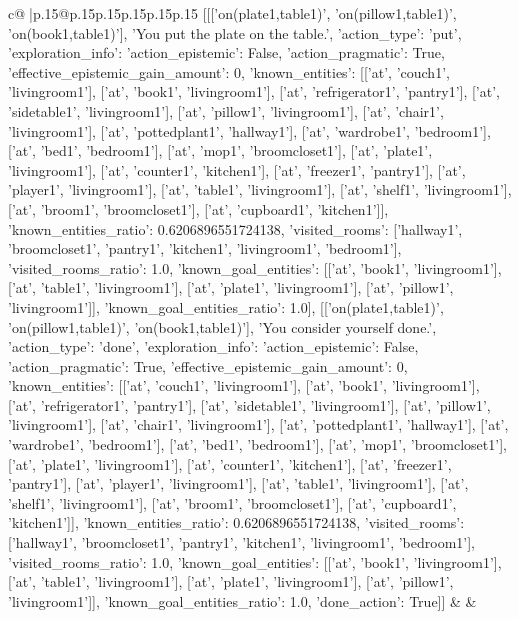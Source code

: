 \documentclass{article}
\begin{document}
{\begin{supertabular}{c@{$\;$}|p{.15\linewidth}@{}p{.15\linewidth}p{.15\linewidth}p{.15\linewidth}p{.15\linewidth}p{.15\linewidth}}
{{{	 [[['on(plate1,table1)', 'on(pillow1,table1)', 'on(book1,table1)'], 'You put the plate on the table.', {'action_type': 'put', 'exploration_info': {'action_epistemic': False, 'action_pragmatic': True, 'effective_epistemic_gain_amount': 0, 'known_entities': [['at', 'couch1', 'livingroom1'], ['at', 'book1', 'livingroom1'], ['at', 'refrigerator1', 'pantry1'], ['at', 'sidetable1', 'livingroom1'], ['at', 'pillow1', 'livingroom1'], ['at', 'chair1', 'livingroom1'], ['at', 'pottedplant1', 'hallway1'], ['at', 'wardrobe1', 'bedroom1'], ['at', 'bed1', 'bedroom1'], ['at', 'mop1', 'broomcloset1'], ['at', 'plate1', 'livingroom1'], ['at', 'counter1', 'kitchen1'], ['at', 'freezer1', 'pantry1'], ['at', 'player1', 'livingroom1'], ['at', 'table1', 'livingroom1'], ['at', 'shelf1', 'livingroom1'], ['at', 'broom1', 'broomcloset1'], ['at', 'cupboard1', 'kitchen1']], 'known_entities_ratio': 0.6206896551724138, 'visited_rooms': ['hallway1', 'broomcloset1', 'pantry1', 'kitchen1', 'livingroom1', 'bedroom1'], 'visited_rooms_ratio': 1.0, 'known_goal_entities': [['at', 'book1', 'livingroom1'], ['at', 'table1', 'livingroom1'], ['at', 'plate1', 'livingroom1'], ['at', 'pillow1', 'livingroom1']], 'known_goal_entities_ratio': 1.0}}], [['on(plate1,table1)', 'on(pillow1,table1)', 'on(book1,table1)'], 'You consider yourself done.', {'action_type': 'done', 'exploration_info': {'action_epistemic': False, 'action_pragmatic': True, 'effective_epistemic_gain_amount': 0, 'known_entities': [['at', 'couch1', 'livingroom1'], ['at', 'book1', 'livingroom1'], ['at', 'refrigerator1', 'pantry1'], ['at', 'sidetable1', 'livingroom1'], ['at', 'pillow1', 'livingroom1'], ['at', 'chair1', 'livingroom1'], ['at', 'pottedplant1', 'hallway1'], ['at', 'wardrobe1', 'bedroom1'], ['at', 'bed1', 'bedroom1'], ['at', 'mop1', 'broomcloset1'], ['at', 'plate1', 'livingroom1'], ['at', 'counter1', 'kitchen1'], ['at', 'freezer1', 'pantry1'], ['at', 'player1', 'livingroom1'], ['at', 'table1', 'livingroom1'], ['at', 'shelf1', 'livingroom1'], ['at', 'broom1', 'broomcloset1'], ['at', 'cupboard1', 'kitchen1']], 'known_entities_ratio': 0.6206896551724138, 'visited_rooms': ['hallway1', 'broomcloset1', 'pantry1', 'kitchen1', 'livingroom1', 'bedroom1'], 'visited_rooms_ratio': 1.0, 'known_goal_entities': [['at', 'book1', 'livingroom1'], ['at', 'table1', 'livingroom1'], ['at', 'plate1', 'livingroom1'], ['at', 'pillow1', 'livingroom1']], 'known_goal_entities_ratio': 1.0}, 'done_action': True}]] 
	  } 
	   } 
	   } 
	 & & \\ 
 

    \theutterance {}  


\end{supertabular}}
\end{document}
